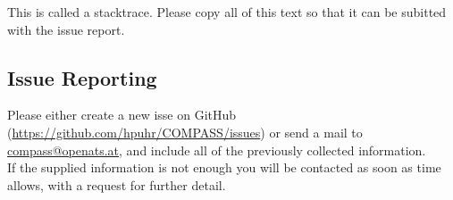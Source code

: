This is called a stacktrace. Please copy all of this text so that it can be subitted with the issue report.

\subsection{Issue Reporting}

Please either create a new isse on GitHub (\url{https://github.com/hpuhr/COMPASS/issues}) or send a mail to \href{mailto:compass@openats.at}{compass@openats.at}, and include all of the previously collected information. \\

If the supplied information is not enough you will be contacted as soon as time allows, with a request for further detail.



